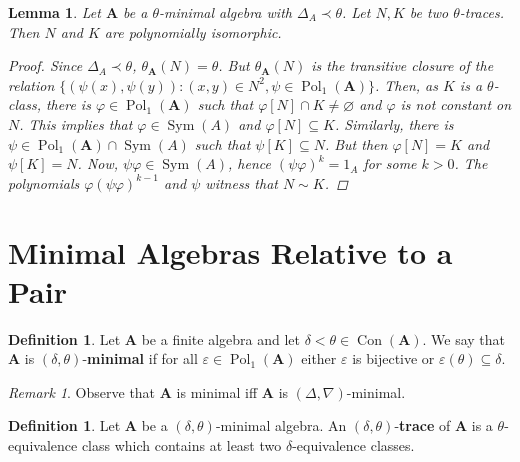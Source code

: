 \documentclass{amsart}
\theoremstyle{plain}
\newtheorem{lemma}[theorem]{Lemma}
\theoremstyle{definition}
\newtheorem{definition}[theorem]{Definition}
\theoremstyle{remark}
\newtheorem{remark}[theorem]{Remark}
\def\phi{\varphi}
\def\epsilon{\varepsilon}
\DeclareMathOperator{\Con}{Con}
\DeclareMathOperator{\Pol}{Pol}
\DeclareMathOperator{\Sym}{Sym}
\DeclareMathOperator{\M}{M}
\begin{document}
\begin{lemma}
    Let $\mathbf{A}$ be a $\theta$-minimal algebra with $\Delta_A \prec \theta$. 
    Let $N,K$ be two $\theta$-traces. 
    Then $N$ and $K$ are polynomially isomorphic. 
    \begin{proof}
        Since $\Delta_A \prec \theta$, $\theta_{\mathbf{A}}(N)=\theta$. 
        But $\theta_{\mathbf{A}}(N)$ is the transitive closure of the relation 
        $\{(\psi(x), \psi(y)) : (x,y) \in N^2, \psi \in \Pol_1(\mathbf{A})\}$. 
        Then, as $K$ is a $\theta$-class, there is $\phi \in \Pol_1(\mathbf{A})$ such that $\phi[N] \cap K \neq \varnothing$ 
        and $\phi$ is not constant on $N$. 
        This implies that $\phi \in \Sym(A)$ and $\phi[N] \subseteq K$. 
        Similarly, there is $\psi \in \Pol_1(\mathbf{A}) \cap \Sym(A)$ such that $\psi[K]\subseteq N$. 
        But then $\phi[N]=K$ and $\psi[K]=N$. 
        Now, $\psi \phi \in \Sym(A)$, hence $(\psi \phi)^k = 1_A$ for some $k > 0$. 
        The polynomials $\phi(\psi \phi)^{k-1}$ and $\psi$ witness that $N \sim K$.
    \end{proof}
\end{lemma}

\section{Minimal Algebras Relative to a Pair} 
\begin{definition}
    Let $\mathbf{A}$ be a finite algebra and let $\delta < \theta \in \Con(\mathbf{A})$. 
    We say that $\mathbf{A}$ is $(\delta, \theta)$-\textbf{minimal} if for all $\epsilon \in \Pol_1(\mathbf{A})$ either $\epsilon$ is bijective or $\epsilon(\theta) \subseteq \delta$. 
\end{definition}

\begin{remark}
    Observe that $\mathbf{A}$ is minimal iff $\mathbf{A}$ is $(\Delta, \nabla)$-minimal. 
\end{remark}

\begin{definition}
    Let $\mathbf{A}$ be a $(\delta, \theta)$-minimal algebra. 
    An $(\delta, \theta)$-\textbf{trace} of $\mathbf{A}$ is 
    a $\theta$-equivalence class which contains at least two $\delta$-equivalence classes. 
\end{definition}
\end{document}
